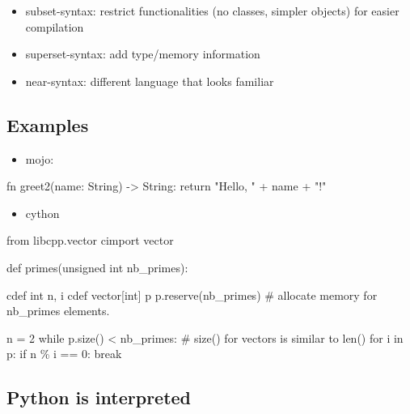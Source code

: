 \documentclass[
  letterpaper,
  DIV=11,
  numbers=noendperiod]{scrartcl}
\newenvironment{Shaded}{\begin{snugshade}}{\end{snugshade}}
\newcommand{\NormalTok}[1]{\textcolor[rgb]{0.00,0.23,0.31}{#1}}
\providecommand{\tightlist}{%
  \setlength{\itemsep}{0pt}\setlength{\parskip}{0pt}}\usepackage{longtable,booktabs,array}
\begin{document}
\begin{itemize}
\tightlist
\item
  subset-syntax: restrict functionalities (no classes, simpler objects)
  for easier compilation
\item
  superset-syntax: add type/memory information
\item
  near-syntax: different language that looks familiar
\end{itemize}

\subsection{Examples}\label{examples}

\begin{itemize}
\tightlist
\item
  mojo:
\end{itemize}

\begin{Shaded}
\begin{Highlighting}[]
\NormalTok{fn greet2(name: String) {-}\textgreater{} String:}
\NormalTok{    return "Hello, " + name + "!"}
\end{Highlighting}
\end{Shaded}

\begin{itemize}
\tightlist
\item
  cython
\end{itemize}

\begin{Shaded}
\begin{Highlighting}[]
\NormalTok{from libcpp.vector cimport vector}

\NormalTok{def primes(unsigned int nb\_primes):}

\NormalTok{    cdef int n, i}
\NormalTok{    cdef vector[int] p}
\NormalTok{    p.reserve(nb\_primes)  \# allocate memory for \textquotesingle{}nb\_primes\textquotesingle{} elements.}

\NormalTok{    n = 2}
\NormalTok{    while p.size() \textless{} nb\_primes:  \# size() for vectors is similar to len()}
\NormalTok{        for i in p:}
\NormalTok{            if n \% i == 0:}
\NormalTok{                break }
\end{Highlighting}
\end{Shaded}

\subsection{Python is interpreted}\label{python-is-interpreted}
\end{document}
